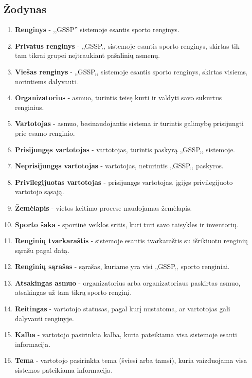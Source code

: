 \documentclass{VUMIFPSkursinis}
\begin{document}
        \subsection*{Žodynas} \label{strukturinisDSModelis_zodynas}
            \begin{enumerate}[label=\textbf{E\arabic*.}]
                \item \textbf{Renginys} - ,,GSSP'' sistemoje esantis sporto renginys.
				\item \textbf{Privatus renginys} - „GSSP,, sistemoje esantis sporto renginys, skirtas tik tam tikrai grupei neįtraukiant pašalinių asmenų.
				\item \textbf{Viešas renginys} - „GSSP,, sistemoje esantis sporto renginys, skirtas visiems, norintiems dalyvauti.
                \item \textbf{Organizatorius} - asmuo, turintis teisę kurti ir valdyti savo sukurtus renginius.
                \item \textbf{Vartotojas} - asmuo, besinaudojantis sistema ir turintis galimybę prisijungti prie esamo renginio.
				\item \textbf{Prisijungęs vartotojas} - vartotojas, turintis paskyrą „GSSP,, sistemoje.
				\item \textbf{Neprisijungęs vartotojas} - vartotojas, neturintis „GSSP,, paskyros.
				\item \textbf{Privilegijuotas vartotojas} - prisijungęs vartotojas, įgijęs privilegijuoto vartotojo sąsają.
                \item \textbf{Žemėlapis} - vietos keitimo procese naudojamas žemėlapis.
				\item \textbf{Sporto šaka} - sportinė veiklos sritis, kuri turi savo taisykles ir inventorių.
				\item \textbf{Renginių tvarkaraštis} - sistemoje esantis tvarkaraštis su išrikiuotu renginių sąrašu pagal datą.
				\item \textbf{Renginių sąrašas} - sąrašas, kuriame yra visi „GSSP,, sporto renginiai.
				\item \textbf{Atsakingas asmuo} - organizatorius arba organizatoriaus paskirtas asmuo, atsakingas už tam tikrą sporto renginį.
				\item \textbf{Reitingas} - vartotojo statusas, pagal kurį nustatoma, ar vartotojas gali dalyvauti renginyje.
				\item \textbf{Kalba} - vartotojo pasirinkta kalba, kuria pateikiama visa sistemoje esanti informacija.
				\item \textbf{Tema} - vartotojo pasirinkta tema (šviesi arba tamsi), kuria vaizduojama visa sistemos pateikiama informacija.

\end{enumerate}
\end{document}
